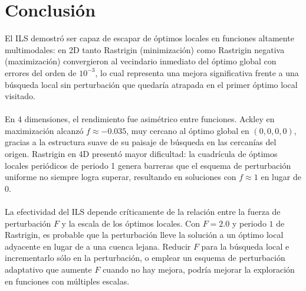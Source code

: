 \documentclass[11pt]{article}
\begin{document}
\section{Conclusi\'on}

El ILS demostr\'o ser capaz de escapar de \'optimos locales en funciones altamente multimodales: en 2D tanto Rastrigin (minimizaci\'on) como Rastrigin negativa (maximizaci\'on) convergieron al vecindario inmediato del \'optimo global con errores del orden de $10^{-3}$, lo cual representa una mejora significativa frente a una b\'usqueda local sin perturbaci\'on que quedar\'ia atrapada en el primer \'optimo local visitado.\\\\
En 4 dimensiones, el rendimiento fue asim\'etrico entre funciones. Ackley en maximizaci\'on alcanz\'o $f \approx -0.035$, muy cercano al \'optimo global en $(0,0,0,0)$, gracias a la estructura suave de su paisaje de b\'usqueda en las cercan\'ias del origen. Rastrigin en 4D present\'o mayor dificultad: la cuadr\'icula de \'optimos locales peri\'odicos de periodo 1 genera barreras que el esquema de perturbaci\'on uniforme no siempre logra superar, resultando en soluciones con $f \approx 1$ en lugar de $0$.\\\\
La efectividad del ILS depende cr\'iticamente de la relaci\'on entre la fuerza de perturbaci\'on $F$ y la escala de los \'optimos locales. Con $F = 2.0$ y periodo $1$ de Rastrigin, es probable que la perturbaci\'on lleve la soluci\'on a un \'optimo local adyacente en lugar de a una cuenca lejana. Reducir $F$ para la b\'usqueda local e incrementarlo s\'olo en la perturbaci\'on, o emplear un esquema de perturbaci\'on adaptativo que aumente $F$ cuando no hay mejora, podr\'ia mejorar la exploraci\'on en funciones con m\'ultiples escalas.
\end{document}
